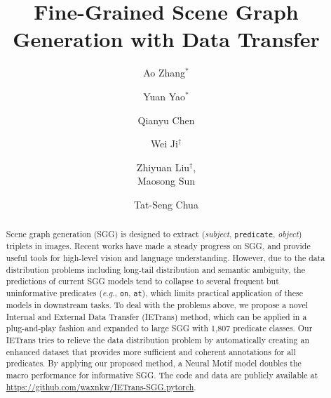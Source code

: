 \documentclass[runningheads]{llncs}
\newcommand{\eg}{\textit{e}.\textit{g}.}
\begin{document}
\pagestyle{headings}
\mainmatter
\def\ECCVSubNumber{2734}  

\title{Fine-Grained Scene Graph Generation with Data Transfer} 

\begin{comment}
\titlerunning{ECCV-22 submission ID \ECCVSubNumber} 
\authorrunning{ECCV-22 submission ID \ECCVSubNumber} 
\author{Anonymous ECCV submission}
\institute{Paper ID \ECCVSubNumber}
\end{comment}


\author{Ao Zhang$^*$ \and
Yuan Yao$^*$ \and
Qianyu Chen \and Wei Ji$^\dag$ 
\and Zhiyuan Liu$^\dag$, \\ 
 Maosong Sun \and Tat-Seng Chua}

{\let\thefootnote\relax{}}
{\let\thefootnote\relax{}}


\maketitle

\begin{abstract}
Scene graph generation (SGG) is designed to extract (\textit{subject}, \texttt{predicate}, \textit{object}) triplets in images. 
Recent works have made a steady progress on SGG, and provide useful tools for high-level vision and language understanding.
However, due to the data distribution problems including long-tail distribution and semantic ambiguity, the predictions of current SGG models tend to collapse to several frequent but uninformative predicates (\eg, \texttt{on}, \texttt{at}), which limits practical application of these models in downstream tasks. 
To deal with the problems above, we propose a novel Internal and External Data Transfer (IETrans) method, which can be applied in a plug-and-play fashion and expanded to large SGG with 1,807 predicate classes.
Our IETrans tries to relieve the data distribution problem by automatically creating an enhanced dataset that provides more sufficient and coherent annotations for all predicates. 
By applying our proposed method, a Neural Motif model doubles the macro performance for informative SGG.
The code and data are publicly available at \url{https://github.com/waxnkw/IETrans-SGG.pytorch}.
\end{abstract}
\end{document}
